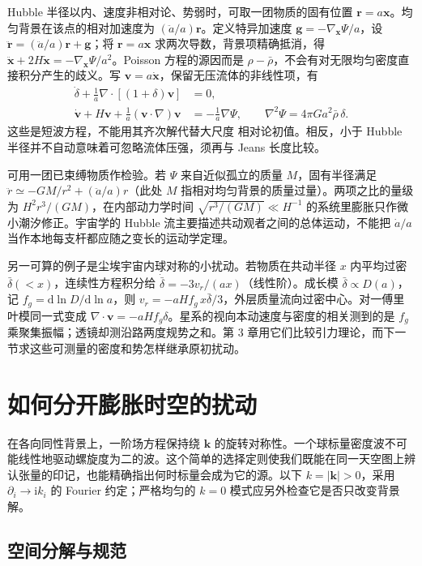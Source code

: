 Hubble 半径以内、速度非相对论、势弱时，可取一团物质的固有位置 $\bm r=a\bm x$。均匀背景在该点的相对加速度为 $(\ddot a/a)\bm r$。定义特异加速度 $\bm g=-\nabla_{\bm x}\Psi/a$，设 $\ddot{\bm r}=(\ddot a/a)\bm r+\bm g$；将 $\bm r=a\bm x$ 求两次导数，背景项精确抵消，得 $\ddot{\bm x}+2H\dot{\bm x}=-\nabla_{\bm x}\Psi/a^2$。Poisson 方程的源因而是 $\rho-\bar\rho$，不会有对无限均匀密度直接积分产生的歧义。写 $\bm v=a\dot{\bm x}$，保留无压流体的非线性项，有
\begin{align*}
 \dot\delta+\frac1a\nabla\cdot[(1+\delta)\bm v]&=0,\\
 \dot{\bm v}+H\bm v+\frac1a(\bm v\cdot\nabla)\bm v&=-\frac1a\nabla\Psi,\qquad
 \nabla^2\Psi=4\pi G a^2\bar\rho\,\delta .
\end{align*}
这些是短波方程，不能用其齐次解代替大尺度 相对论初值。相反，小于 Hubble 半径并不自动意味着可忽略流体压强，须再与 Jeans 长度比较。

可用一团已束缚物质作检验。若 $\Psi$ 来自近似孤立的质量 $M$，固有半径满足 $\ddot r\simeq-GM/r^2+(\ddot a/a)r$（此处 $M$ 指相对均匀背景的质量过量）。两项之比的量级为 $H^2r^3/(GM)$，在内部动力学时间 $\sqrt{r^3/(GM)}\ll H^{-1}$ 的系统里膨胀只作微小潮汐修正。宇宙学的 Hubble 流主要描述共动观者之间的总体运动，不能把 $\dot a/a$ 当作本地每支杆都应随之变长的运动学定理。

另一可算的例子是尘埃宇宙内球对称的小扰动。若物质在共动半径 $x$ 内平均过密 $\bar\delta(<x)$，连续性方程积分给 $\dot{\bar\delta}=-3v_r/(ax)$（线性阶）。成长模 $\bar\delta\propto D(a)$，记 $f_g=\mathrm d\ln D/\mathrm d\ln a$，则 $v_r=-aH f_g\,x\bar\delta/3$，外层质量流向过密中心。对一傅里叶模同一式变成 $\nabla\cdot\bm v=-aH f_g\delta$。星系的视向本动速度与密度的相关测到的是 $f_g$ 乘聚集振幅；透镜却测沿路两度规势之和。第 3 章用它们比较引力理论，而下一节求这些可测量的密度和势怎样继承原初扰动。
\section{如何分开膨胀时空的扰动}\label{sec:gw-dpert}

在各向同性背景上，一阶场方程保持绕 $\bm k$ 的旋转对称性。一个球标量密度波不可能线性地驱动螺旋度为二的波。这个简单的选择定则使我们既能在同一天空图上辨认张量的印记，也能精确指出何时标量会成为它的源。以下 $k=|\bm k|>0$，采用 $\partial_i\to\mathrm i k_i$ 的 Fourier 约定；严格均匀的 $k=0$ 模式应另外检查它是否只改变背景解。

\subsection{空间分解与规范}


